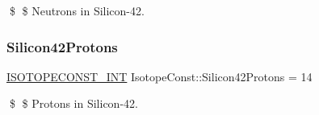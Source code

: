 \$ \$ Neutrons in Silicon-\/42. \mbox{\label{group___isotope_const-_silicon-_si42_ga8386291d226b045ae9c04ed79b6af5a9}} 
\subsubsection{\texorpdfstring{Silicon42\+Protons}{Silicon42Protons}}
{\footnotesize\ttfamily \mbox{\hyperlink{group___isotope_const-_macros_ga5f18360b3e99483a35c32d789e62621c}{I\+S\+O\+T\+O\+P\+E\+C\+O\+N\+S\+T\+\_\+\+I\+NT}} Isotope\+Const\+::\+Silicon42\+Protons = 14}

\$ \$ Protons in Silicon-\/42. 